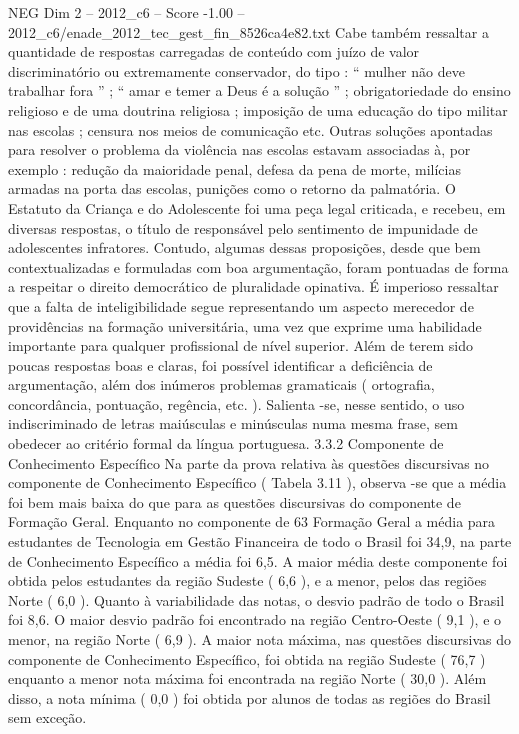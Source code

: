 \begin{textsample}{NEG Dim 2 – 2012\_c6 – Score -1.00 – 2012\_c6/enade\_2012\_tec\_gest\_fin\_8526ca4e82.txt}
Cabe também ressaltar a quantidade de respostas carregadas de conteúdo com juízo de valor discriminatório ou extremamente conservador, do tipo : “ mulher não deve trabalhar fora ” ; “ amar e temer a Deus é a solução ” ; obrigatoriedade do ensino religioso e de uma doutrina religiosa ; imposição de uma educação do tipo militar nas escolas ; censura nos meios de comunicação etc.
Outras soluções apontadas para resolver o problema da violência nas escolas estavam associadas à, por exemplo : redução da maioridade penal, defesa da pena de morte, milícias armadas na porta das escolas, punições como o retorno da palmatória.
O Estatuto da Criança e do Adolescente foi uma peça legal criticada, e recebeu, em diversas respostas, o título de responsável pelo sentimento de impunidade de adolescentes infratores.
Contudo, algumas dessas proposições, desde que bem contextualizadas e formuladas com boa argumentação, foram pontuadas de forma a respeitar o direito democrático de pluralidade opinativa.
É imperioso ressaltar que a falta de inteligibilidade segue representando um aspecto merecedor de providências na formação universitária, uma vez que exprime uma habilidade importante para qualquer profissional de nível superior.
Além de terem sido poucas respostas boas e claras, foi possível identificar a deficiência de argumentação, além dos inúmeros problemas gramaticais ( ortografia, concordância, pontuação, regência, etc. ).
Salienta -se, nesse sentido, o uso indiscriminado de letras maiúsculas e minúsculas numa mesma frase, sem obedecer ao critério formal da língua portuguesa. 3.3.2 Componente de Conhecimento Específico Na parte da prova relativa às questões discursivas no componente de Conhecimento Específico ( Tabela 3.11 ), observa -se que a média foi bem mais baixa do que para as questões discursivas do componente de Formação Geral.
Enquanto no componente de 63 Formação Geral a média para estudantes de Tecnologia em Gestão Financeira de todo o Brasil foi 34,9, na parte de Conhecimento Específico a média foi 6,5.
A maior média deste componente foi obtida pelos estudantes da região Sudeste ( 6,6 ), e a menor, pelos das regiões Norte ( 6,0 ).
Quanto à variabilidade das notas, o desvio padrão de todo o Brasil foi 8,6.
O maior desvio padrão foi encontrado na região Centro-Oeste ( 9,1 ), e o menor, na região Norte ( 6,9 ).
A maior nota máxima, nas questões discursivas do componente de Conhecimento Específico, foi obtida na região Sudeste ( 76,7 ) enquanto a menor nota máxima foi encontrada na região Norte ( 30,0 ).
Além disso, a nota mínima ( 0,0 ) foi obtida por alunos de todas as regiões do Brasil sem exceção.

\end{textsample}
